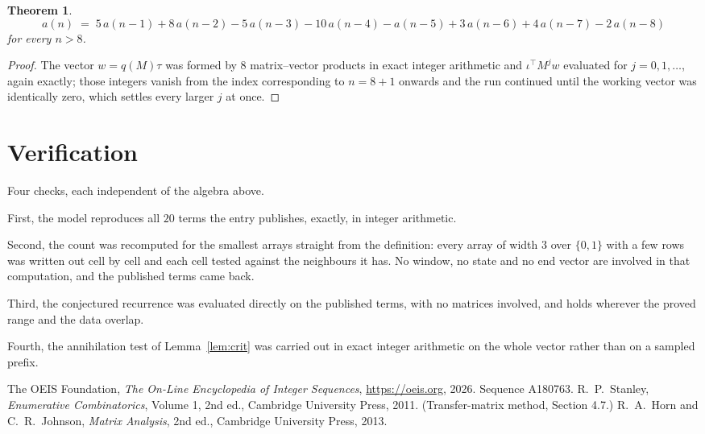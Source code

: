 \documentclass[11pt,a4paper]{article}
\theoremstyle{plain}
\newtheorem{theorem}{Theorem}
\theoremstyle{definition}
\begin{document}
\begin{theorem}
\[
a(n)\;=\;5\,a(n-1) + 8\,a(n-2) - 5\,a(n-3) - 10\,a(n-4) - a(n-5) + 3\,a(n-6) + 4\,a(n-7) - 2\,a(n-8)
\]
for every $n>8$.
\end{theorem}

\begin{proof}
The vector $w=q(M)\tau$ was formed by $8$ matrix--vector products in exact integer
arithmetic and $\iota^{\!\top}M^{j}w$ evaluated for $j=0,1,\dots$, again exactly; those
integers vanish from the index corresponding to $n=8+1$ onwards and the run continued
until the working vector was identically zero, which settles every larger $j$ at once.
\end{proof}

\section{Verification}

Four checks, each independent of the algebra above.

First, the model reproduces all $20$ terms the entry publishes, exactly, in integer
arithmetic.

Second, the count was recomputed for the smallest arrays straight from the definition: every
array of width $3$ over $\{0,1\}$ with a few rows was written out cell by cell and each cell
tested against the neighbours it has. No window, no state and no end vector are involved in that
computation, and the published terms came back.

Third, the conjectured recurrence was evaluated directly on the published terms, with no
matrices involved, and holds wherever the proved range and the data overlap.

Fourth, the annihilation test of Lemma~\ref{lem:crit} was carried out in exact integer
arithmetic on the whole vector rather than on a sampled prefix.

\begin{thebibliography}{9}
 The OEIS Foundation, \emph{The On-Line Encyclopedia of Integer
Sequences}, \url{https://oeis.org}, 2026. Sequence A180763.
 R.~P.~Stanley, \emph{Enumerative Combinatorics}, Volume 1, 2nd ed.,
Cambridge University Press, 2011. (Transfer-matrix method, Section 4.7.)
 R.~A.~Horn and C.~R.~Johnson, \emph{Matrix Analysis}, 2nd ed., Cambridge
University Press, 2013.
\end{thebibliography}
\end{document}
